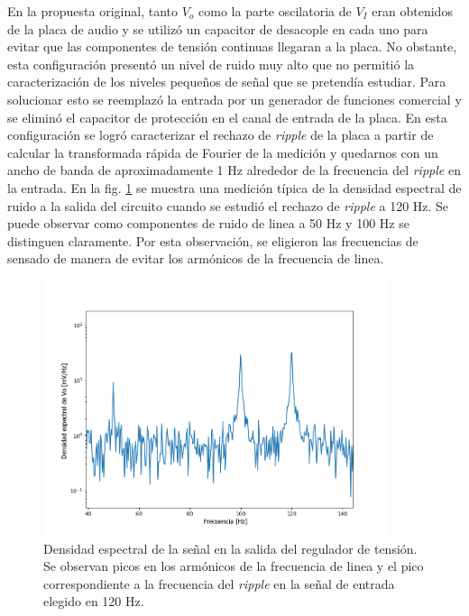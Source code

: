 \documentclass[a4paper,11pt]{article}
\begin{document}
En la propuesta original, tanto $V_o$ como la parte oscilatoria de $V_I$ eran obtenidos de la placa de audio y se utilizó un capacitor de desacople en cada uno para evitar que las componentes de tensión continuas llegaran a la placa. No obstante, esta configuración presentó un nivel de ruido muy alto que no permitió la caracterización de los niveles pequeños de señal que se pretendía estudiar. Para solucionar esto se reemplazó la entrada por un generador de funciones comercial y se eliminó el capacitor de protección en el canal de entrada de la placa. En esta configuración se logró caracterizar el rechazo de \textit{ripple} de la placa a partir de calcular la transformada rápida de Fourier de la medición y quedarnos con un ancho de banda de aproximadamente 1 Hz alrededor de la frecuencia del \textit{ripple} en la entrada. En la fig. \ref{fig:fft} se muestra una medición típica de la densidad espectral de ruido a la salida del circuito cuando se estudió el rechazo de \textit{ripple} a 120 Hz. Se puede observar como componentes de ruido de linea a 50 Hz y 100 Hz se distinguen claramente. Por esta observación, se eligieron las frecuencias de sensado de manera de evitar los armónicos de la frecuencia de linea.  
		
	\begin{figure}[h]
		\centering
		\includegraphics[width=0.9\textwidth]{imagenes/riple120.png}
		\caption{Densidad espectral de la señal en la salida del regulador de tensión. Se observan picos en los armónicos de la frecuencia de linea y el pico correspondiente a la frecuencia del \textit{ripple} en la señal de entrada elegido en 120 Hz.}
		\label{fig:fft}
	\end{figure}
		
\end{document}
